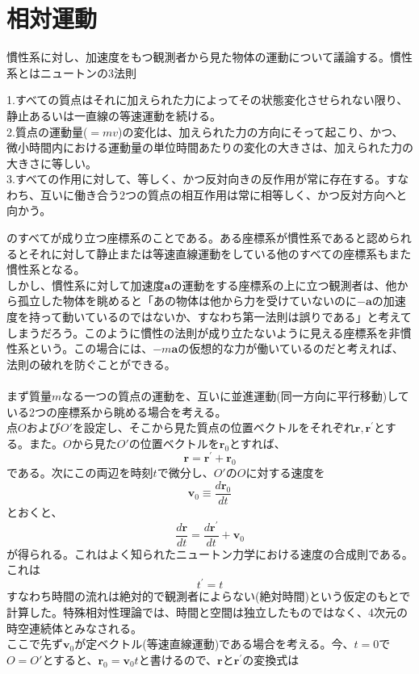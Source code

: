 \documentclass{jsarticle}
\begin{document}
\section{相対運動}
\noindent
慣性系に対し、加速度をもつ観測者から見た物体の運動について議論する。慣性系とはニュートンの3法則
\begin{itembox}[l]{}
1.すべての質点はそれに加えられた力によってその状態変化させられない限り、静止あるいは一直線の等速運動を続ける。\\
2.質点の運動量(\(=mv\))の変化は、加えられた力の方向にそって起こり、かつ、微小時間内における運動量の単位時間あたりの変化の大きさは、加えられた力の大きさに等しい。\\
3.すべての作用に対して、等しく、かつ反対向きの反作用が常に存在する。すなわち、互いに働き合う2つの質点の相互作用は常に相等しく、かつ反対方向へと向かう。
\end{itembox}
のすべてが成り立つ座標系のことである。ある座標系が慣性系であると認められるとそれに対して静止または等速直線運動をしている他のすべての座標系もまた慣性系となる。\\
しかし、慣性系に対して加速度\(\bm{a}\)の運動をする座標系の上に立つ観測者は、他から孤立した物体を眺めると「あの物体は他から力を受けていないのに\(-\bm{a}\)の加速度を持って動いているのではないか、すなわち第一法則は誤りである」と考えてしまうだろう。このように慣性の法則が成り立たないように見える座標系を非慣性系という。この場合には、\(-m\bm{a}\)の仮想的な力が働いているのだと考えれば、法則の破れを防ぐことができる。\\
\\
まず質量\(m\)なる一つの質点の運動を、互いに並進運動(同一方向に平行移動)している2つの座標系から眺める場合を考える。\\
点\(O\)および\(O'\)を設定し、そこから見た質点の位置ベクトルをそれぞれ\(\bm{r},\bm{r}^{\prime}\)とする。また。\(O\)から見た\(O'\)の位置ベクトルを\(\bm{r}_{0}\)とすれば、
\[\bm{r}=\bm{r}^{\prime}+\bm{r}_{0}\]
である。次にこの両辺を時刻\(t\)で微分し、\(O'\)の\(O\)に対する速度を
\[\bm{v}_{0}\equiv\frac{d\bm{r}_{0}}{dt}\]
とおくと、
\[\frac{d\bm{r}}{dt}=\frac{d\bm{r}^{\prime}}{dt}+\bm{v}_{0}\]
が得られる。これはよく知られたニュートン力学における速度の合成則である。これは
\[t^{\prime}=t\]
すなわち時間の流れは絶対的で観測者によらない(絶対時間)という仮定のもとで計算した。特殊相対性理論では、時間と空間は独立したものではなく、4次元の時空連続体とみなされる。\\
ここで先ず\(\bm{v}_{0}\)が定ベクトル(等速直線運動)である場合を考える。今、\(t=0\)で\(O=O'\)とすると、\(\bm{r}_{0}=\bm{v}_{0}t\)と書けるので、\(\bm{r}と\bm{r}^{\prime}\)の変換式は
\end{document}
